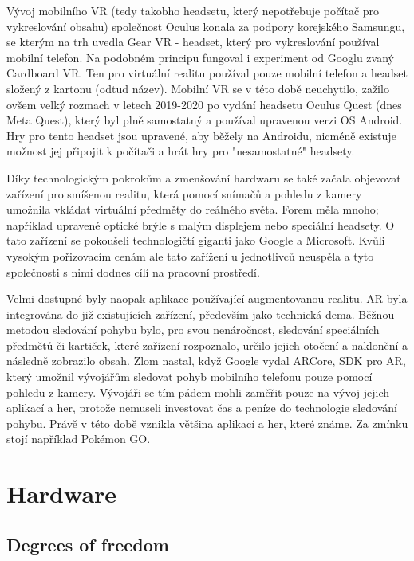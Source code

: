 Vývoj mobilního VR (tedy takobho headsetu, který nepotřebuje počítač pro vykreslování obsahu) společnost Oculus konala za podpory korejského Samsungu, se kterým na trh uvedla Gear VR - headset, který pro vykreslování používal mobilní telefon. Na podobném principu fungoval i experiment od Googlu zvaný Cardboard VR. Ten pro virtuální realitu používal pouze mobilní telefon a headset složený z kartonu (odtud název). Mobilní VR se v této době neuchytilo, zažilo ovšem velký rozmach v letech 2019-2020 po vydání headsetu Oculus Quest (dnes Meta Quest), který byl plně samostatný a používal upravenou verzi OS Android. Hry pro tento headset jsou upravené, aby běžely na Androidu, nicméně existuje možnost jej připojit k počítači a hrát hry pro "nesamostatné" headsety. \cite{otechnice_3}

Díky technologickým pokrokům a zmenšování hardwaru se také začala objevovat zařízení pro smíšenou realitu, která pomocí snímačů a pohledu z kamery umožnila vkládat virtuální předměty do reálného světa. Forem měla mnoho; například upravené optické brýle s malým displejem nebo speciální headsety. O tato zařízení se pokoušeli technologičtí giganti jako Google a Microsoft. Kvůli vysokým pořizovacím cenám ale tato zařížení u jednotlivců neuspěla a tyto společnosti s nimi dodnes cílí na pracovní prostředí. \cite{google_glass_mobilenet}

Velmi dostupné byly naopak aplikace používající augmentovanou realitu. AR byla integrována do již existujících zařízení, především jako technická dema. Běžnou metodou sledování pohybu bylo, pro svou nenáročnost, sledování speciálních předmětů či kartiček, které zařízení rozpoznalo, určilo jejich otočení a naklonění a následně zobrazilo obsah. Zlom nastal, když Google vydal ARCore, \gls{SDK} pro AR, který umožnil vývojářům sledovat pohyb mobilního telefonu pouze pomocí pohledu z kamery. Vývojáři se tím pádem mohli zaměřit pouze na vývoj jejich aplikací a her, protože nemuseli investovat čas a peníze do technologie sledování pohybu. Právě v této době vznikla většina aplikací a her, které známe. Za zmínku stojí například Pokémon GO. \cite{enwiki:1182789097}

\chapter{Hardware}

\section{Degrees of freedom}

